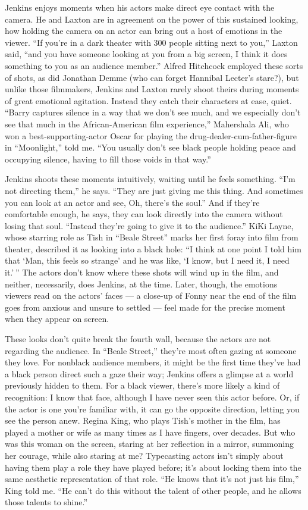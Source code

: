 Jenkins enjoys moments when his actors make direct eye contact with the
camera. He and Laxton are in agreement on the power of this sustained
looking, how holding the camera on an actor can bring out a host of
emotions in the viewer. ``If you're in a dark theater with 300 people
sitting next to you,'' Laxton said, ``and you have someone looking at
you from a big screen, I think it does something to you as an audience
member.'' Alfred Hitchcock employed these sorts of shots, as did
Jonathan Demme (who can forget Hannibal Lecter's stare?), but unlike
those filmmakers, Jenkins and Laxton rarely shoot theirs during moments
of great emotional agitation. Instead they catch their characters at
ease, quiet. ``Barry captures silence in a way that we don't see much,
and we especially don't see that much in the African-American film
experience,'' Mahershala Ali, who won a best-supporting-actor Oscar for
playing the drug-dealer-cum-father-figure in ``Moonlight,'' told me.
``You usually don't see black people holding peace and occupying
silence, having to fill those voids in that way.''

Jenkins shoots these moments intuitively, waiting until he feels
something. ``I'm not directing them,'' he says. ``They are just giving
me this thing. And sometimes you can look at an actor and see, Oh,
there's the soul.'' And if they're comfortable enough, he says, they can
look directly into the camera without losing that soul. ``Instead
they're going to give it to the audience.'' KiKi Layne, whose starring
role as Tish in ``Beale Street'' marks her first foray into film from
theater, described it as looking into a black hole: ``I think at one
point I told him that `Man, this feels so strange' and he was like, `I
know, but I need it, I need it.' '' The actors don't know where these
shots will wind up in the film, and neither, necessarily, does Jenkins,
at the time. Later, though, the emotions viewers read on the actors'
faces --- a close-up of Fonny near the end of the film goes from anxious
and unsure to settled --- feel made for the precise moment when they
appear on screen.

These looks don't quite break the fourth wall, because the actors are
not regarding the audience. In ``Beale Street,'' they're most often
gazing at someone they love. For nonblack audience members, it might be
the first time they've had a black person direct such a gaze their way;
Jenkins offers a glimpse at a world previously hidden to them. For a
black viewer, there's more likely a kind of recognition: I know that
face, although I have never seen this actor before. Or, if the actor is
one you're familiar with, it can go the opposite direction, letting you
see the person anew. Regina King, who plays Tish's mother in the film,
has played a mother or wife as many times as I have fingers, over
decades. But who was this woman on the screen, staring at her reflection
in a mirror, summoning her courage, while also staring at me?
Typecasting actors isn't simply about having them play a role they have
played before; it's about locking them into the same aesthetic
representation of that role. ``He knows that it's not just his film,''
King told me. ``He can't do this without the talent of other people, and
he allows those talents to shine.''

